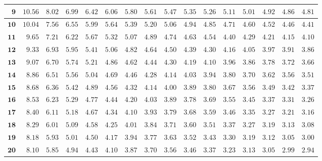 \begin{longtable}{|r|r|r|r|r|r|r|r|r|r|r|r|r|r|r|r|}
    \(\mathbf{9}\) & \(10.56\) & \(8.02\) & \(6.99\) & \(6.42\) & \(6.06\) & \(5.80\) & \(5.61\) & \(5.47\) & \(5.35\) & \(5.26\) & \(5.11\) & \(5.01\) & \(4.92\) & \(4.86\) & \(4.81\) \\ \hline 
    \(\mathbf{10}\) & \(10.04\) & \(7.56\) & \(6.55\) & \(5.99\) & \(5.64\) & \(5.39\) & \(5.20\) & \(5.06\) & \(4.94\) & \(4.85\) & \(4.71\) & \(4.60\) & \(4.52\) & \(4.46\) & \(4.41\) \\ \hline 
    \(\mathbf{11}\) & \(9.65\) & \(7.21\) & \(6.22\) & \(5.67\) & \(5.32\) & \(5.07\) & \(4.89\) & \(4.74\) & \(4.63\) & \(4.54\) & \(4.40\) & \(4.29\) & \(4.21\) & \(4.15\) & \(4.10\) \\ \hline 
    \(\mathbf{12}\) & \(9.33\) & \(6.93\) & \(5.95\) & \(5.41\) & \(5.06\) & \(4.82\) & \(4.64\) & \(4.50\) & \(4.39\) & \(4.30\) & \(4.16\) & \(4.05\) & \(3.97\) & \(3.91\) & \(3.86\) \\ \hline 
    \(\mathbf{13}\) & \(9.07\) & \(6.70\) & \(5.74\) & \(5.21\) & \(4.86\) & \(4.62\) & \(4.44\) & \(4.30\) & \(4.19\) & \(4.10\) & \(3.96\) & \(3.86\) & \(3.78\) & \(3.72\) & \(3.66\) \\ \hline 
    \(\mathbf{14}\) & \(8.86\) & \(6.51\) & \(5.56\) & \(5.04\) & \(4.69\) & \(4.46\) & \(4.28\) & \(4.14\) & \(4.03\) & \(3.94\) & \(3.80\) & \(3.70\) & \(3.62\) & \(3.56\) & \(3.51\) \\ \hline 
    \(\mathbf{15}\) & \(8.68\) & \(6.36\) & \(5.42\) & \(4.89\) & \(4.56\) & \(4.32\) & \(4.14\) & \(4.00\) & \(3.89\) & \(3.80\) & \(3.67\) & \(3.56\) & \(3.49\) & \(3.42\) & \(3.37\) \\ \hline 
    \(\mathbf{16}\) & \(8.53\) & \(6.23\) & \(5.29\) & \(4.77\) & \(4.44\) & \(4.20\) & \(4.03\) & \(3.89\) & \(3.78\) & \(3.69\) & \(3.55\) & \(3.45\) & \(3.37\) & \(3.31\) & \(3.26\) \\ \hline 
    \(\mathbf{17}\) & \(8.40\) & \(6.11\) & \(5.18\) & \(4.67\) & \(4.34\) & \(4.10\) & \(3.93\) & \(3.79\) & \(3.68\) & \(3.59\) & \(3.46\) & \(3.35\) & \(3.27\) & \(3.21\) & \(3.16\) \\ \hline 
    \(\mathbf{18}\) & \(8.29\) & \(6.01\) & \(5.09\) & \(4.58\) & \(4.25\) & \(4.01\) & \(3.84\) & \(3.71\) & \(3.60\) & \(3.51\) & \(3.37\) & \(3.27\) & \(3.19\) & \(3.13\) & \(3.08\) \\ \hline 
    \(\mathbf{19}\) & \(8.18\) & \(5.93\) & \(5.01\) & \(4.50\) & \(4.17\) & \(3.94\) & \(3.77\) & \(3.63\) & \(3.52\) & \(3.43\) & \(3.30\) & \(3.19\) & \(3.12\) & \(3.05\) & \(3.00\) \\ \hline 
    \(\mathbf{20}\) & \(8.10\) & \(5.85\) & \(4.94\) & \(4.43\) & \(4.10\) & \(3.87\) & \(3.70\) & \(3.56\) & \(3.46\) & \(3.37\) & \(3.23\) & \(3.13\) & \(3.05\) & \(2.99\) & \(2.94\) \\ \hline 

\end{longtable}
